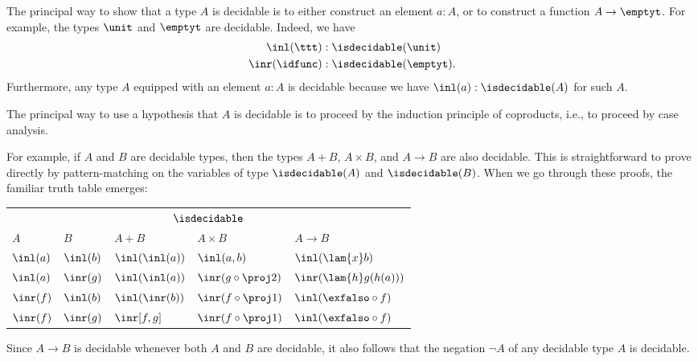 \begin{eg}
  The principal way to show that a type $A$ is decidable is to either construct an element $a:A$, or to construct a function $A\to\emptyt$. For example, the types $\unit$ and $\emptyt$ are decidable. Indeed, we have
  \begin{align*}
    \inl(\ttt) & :\isdecidable(\unit) \\
    \inr(\idfunc) & : \isdecidable(\emptyt).
  \end{align*}
  Furthermore, any type $A$ equipped with an element $a:A$ is decidable because we have $\inl(a):\isdecidable(A)$ for such $A$.
\end{eg}

\begin{eg}\label{eg:decidability-closure}
  The principal way to use a hypothesis that $A$ is decidable is to proceed by the induction principle of coproducts, i.e., to proceed by case analysis.
  
  For example, if $A$ and $B$ are decidable types, then the types $A+B$, $A\times B$, and $A\to B$ are also decidable. This is straightforward to prove directly by pattern-matching on the variables of type $\isdecidable(A)$ and $\isdecidable(B)$. When we go through these proofs, the familiar truth table emerges:
  \begin{center}
    \begin{tabular}{lllll}
      \toprule
      \multicolumn{5}{c}{$\isdecidable$} \\ \cmidrule{1-5}
      $A$ & $B$ & $A+B$ & $A\times B$ & $A\to B$ \\
      \midrule
      $\inl(a)$ & $\inl(b)$ & $\inl(\inl(a))$ & $\inl(a,b)$ & $\inl(\lam{x}b)$ \\
      $\inl(a)$ & $\inr(g)$ & $\inl(\inl(a))$ & $\inr(g\circ \proj 2)$ & $\inr(\lam{h}g(h(a)))$ \\
      $\inr(f)$ & $\inl(b)$ & $\inl(\inr(b))$ & $\inr(f\circ\proj 1)$ & $\inl(\exfalso\circ f)$ \\
      $\inr(f)$ & $\inr(g)$ & $\inr[f,g]$ & $\inr(f\circ\proj 1)$ & $\inl(\exfalso\circ f)$ \\
      \bottomrule
    \end{tabular}
  \end{center}
  Since $A\to B$ is decidable whenever both $A$ and $B$ are decidable, it also follows that the negation $\neg A$ of any decidable type $A$ is decidable.
\end{eg}

